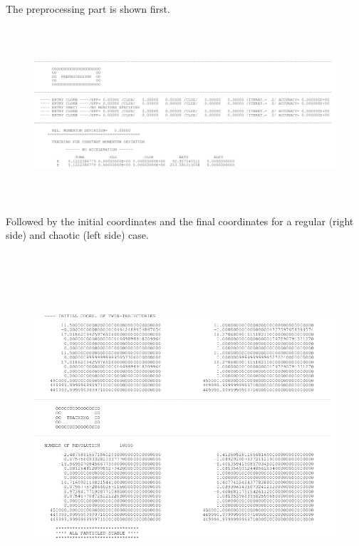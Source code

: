 \documentclass[a4paper,11pt]{report}
\begin{document}
The preprocessing part is shown first.
\begin{figure}[H]\vspace{-5mm}
\begin{center}
  \mbox{\includegraphics[width=16cm,height=6.5cm]{expout2}}
\end{center}
\end{figure}
Followed by the initial coordinates and the final coordinates for a
regular (right side) and chaotic (left side) case.
\begin{figure}[H]\vspace{-5mm}
\begin{center}
  \mbox{\includegraphics[width=16cm,height=13cm]{expout3}}
\end{center}
\end{figure}
\end{document}
